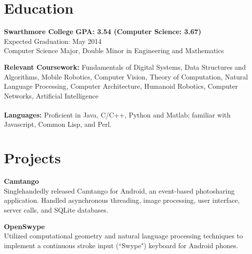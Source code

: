 \documentclass[line]{resume}
\begin{document}
\begin{resume}  %
\section{\mysidestyle Education} 
\textbf{Swarthmore College} \hfill \textbf{GPA: 3.54 (Computer Science: 3.67)}\vspace{1 mm}\\
    Expected Graduation: May 2014\\
    Computer Science Major, Double Minor in Engineering and Mathematics
     
\textbf{Relevant Coursework:} Fundamentals of Digital Systems, Data Structures and Algorithms, Mobile Robotics, Computer Vision, Theory of Computation, Natural Language Processing, Computer Architecture, Humanoid Robotics, Computer Networks, Artificial Intelligence\\ \\
\textbf{Languages:} Proficient in Java, C/C++, Python and Matlab; familiar with Javascript, Common Lisp, and Perl.
\section{\mysidestyle Projects}
\textbf{Camtango} \hfill\\
Singlehandedly released Camtango for Android, an event-based photosharing application. Handled asynchronous threading, image processing, user interface, server calls, and SQLite databases.\vspace{0.5mm}

\textbf{OpenSwype} \hfill\\
Utilized computational geometry and natural language processing techniques to implement a continuous stroke input (``Swype") keyboard for Android phones. \vspace{0.5mm}


\end{resume}
\end{document}

